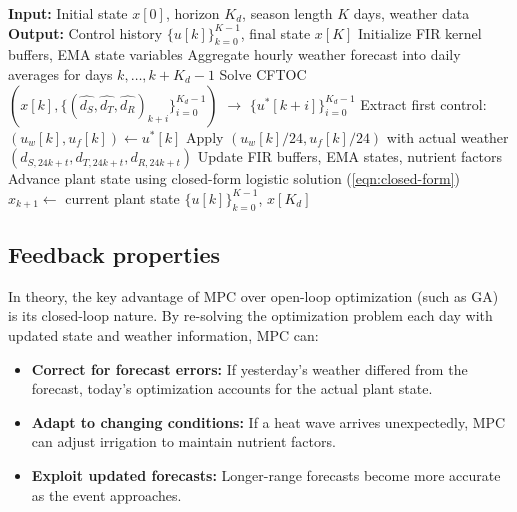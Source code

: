 \documentclass[preprint,12pt]{elsarticle}
\begin{document}
\begin{algorithm}[ht]
\caption{Model Predictive Control for Irrigation and Fertilization}
\label{alg:mpc}
\begin{algorithmic}[1]
\State \textbf{Input:} Initial state $x[0]$, horizon $K_{d}$, season length $K$ days, weather data
\State \textbf{Output:} Control history $\{u[k]\}_{k=0}^{K-1}$, final state $x[K]$
\State
\State Initialize FIR kernel buffers, EMA state variables
    \State Aggregate hourly weather forecast into daily averages for days $k, \ldots, k+K_{d}-1$
    \State Solve CFTOC$(x[k], \{(\hat{d_{S}}, \hat{d_{T}}, \hat{d_{R}})_{k+i}\}_{i=0}^{K_{d}-1})$ $\rightarrow$ $\{u^*[k+i]\}_{i=0}^{K_{d}-1}$
    \State Extract first control: $(u_{w}[k], u_{f}[k]) \leftarrow u^*[k]$
     
        \State Apply $(u_{w}[k]/24, u_{f}[k]/24)$ with actual weather $(d_{S, 24k+t}, d_{T, 24k+t}, d_{R, 24k+t})$
        \State Update FIR buffers, EMA states, nutrient factors
        \State Advance plant state using closed-form logistic solution (\ref{eqn:closed-form})
    \EndFor
    \State $x_{k+1} \leftarrow$ current plant state
\EndFor
\State \Return $\{u[k]\}_{k=0}^{K-1}$, $x[K_{d}]$
\end{algorithmic}
\end{algorithm}

\subsection{Feedback properties}\label{subsec:feedback}

In theory, the key advantage of MPC over open-loop optimization (such as GA) is its closed-loop nature. By re-solving the optimization problem each day with updated state and weather information, MPC can:
\begin{itemize}
\item \textbf{Correct for forecast errors:} If yesterday's weather differed from the forecast, today's optimization accounts for the actual plant state.
\item \textbf{Adapt to changing conditions:} If a heat wave arrives unexpectedly, MPC can adjust irrigation to maintain nutrient factors.
\item \textbf{Exploit updated forecasts:} Longer-range forecasts become more accurate as the event approaches.
\end{itemize}
\end{document}
